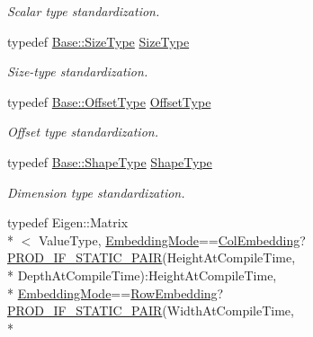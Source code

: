 \begin{DoxyCompactItemize}
\begin{DoxyCompactList}\small\item\em Scalar type standardization. \end{DoxyCompactList}\item 
typedef \hyperlink{classffnn_1_1layer_1_1internal_1_1_interface_af0567642f60c65b5e87067226a54174b}{Base\-::\-Size\-Type} \hyperlink{classffnn_1_1layer_1_1_convolution_volume_a1ca8d2a6071885cf033b006b8a514452}{Size\-Type}
\begin{DoxyCompactList}\small\item\em Size-\/type standardization. \end{DoxyCompactList}\item 
typedef \hyperlink{classffnn_1_1layer_1_1internal_1_1_interface_adc5bb454329ebd51ac26579a43c006fd}{Base\-::\-Offset\-Type} \hyperlink{classffnn_1_1layer_1_1_convolution_volume_ab283a25178a27af3d6162e5ca315c403}{Offset\-Type}
\begin{DoxyCompactList}\small\item\em Offset type standardization. \end{DoxyCompactList}\item 
typedef \hyperlink{classffnn_1_1layer_1_1internal_1_1_interface_a945709b1d0ea54a51539b80d04485f5f}{Base\-::\-Shape\-Type} \hyperlink{classffnn_1_1layer_1_1_convolution_volume_abd66a08414e0b2892f30f4afd32f7e30}{Shape\-Type}
\begin{DoxyCompactList}\small\item\em Dimension type standardization. \end{DoxyCompactList}\item 
typedef Eigen\-::\-Matrix\\*
$<$ Value\-Type, \hyperlink{namespaceffnn_1_1layer_a254f16beba4fb335d935e9b43bb9e69a}{Embedding\-Mode}==\hyperlink{namespaceffnn_1_1layer_a254f16beba4fb335d935e9b43bb9e69aaede1065f5863208cae7e55561966a182}{Col\-Embedding}?\hyperlink{receptive__volume_8h_a74feffebf310dd34521adc2adcaf64c9}{P\-R\-O\-D\-\_\-\-I\-F\-\_\-\-S\-T\-A\-T\-I\-C\-\_\-\-P\-A\-I\-R}(Height\-At\-Compile\-Time, \\*
Depth\-At\-Compile\-Time)\-:Height\-At\-Compile\-Time, \\*
\hyperlink{namespaceffnn_1_1layer_a254f16beba4fb335d935e9b43bb9e69a}{Embedding\-Mode}==\hyperlink{namespaceffnn_1_1layer_a254f16beba4fb335d935e9b43bb9e69aa56bf723aeae4562f2fe05ae5e675da92}{Row\-Embedding}?\hyperlink{receptive__volume_8h_a74feffebf310dd34521adc2adcaf64c9}{P\-R\-O\-D\-\_\-\-I\-F\-\_\-\-S\-T\-A\-T\-I\-C\-\_\-\-P\-A\-I\-R}(Width\-At\-Compile\-Time, \\*

\end{DoxyCompactItemize}

